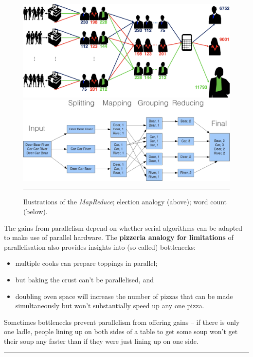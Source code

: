 \begin{figure}[!t]
\centering
\includegraphics[width=\textwidth]{images/DSML/MR1.png}\\ \includegraphics[width=\textwidth]{images/DSML/MR2.png}\caption[\small Illustrations of the \textit{MapReduce} paradigm]{\small Ilustrations of the \textit{MapReduce}; election analogy (above); word count (below).}\hrule\label{fig:MR2}
\end{figure}
\afterpage{\FloatBarrier}
The gains from parallelism depend on whether serial algorithms can be adapted to make use of parallel hardware. The \textbf{pizzeria analogy for limitations} of parallelisation also provides insights into (so-called) bottlenecks: 
\begin{itemize}[noitemsep]
\item multiple cooks can prepare toppings in parallel; 
\item but baking the crust can't be parallelised, and
\item doubling oven space will increase the number of pizzas that can be made simultaneously but won't substantially speed up any one pizza.
\end{itemize}
Sometimes bottlenecks prevent parallelism from offering gains -- if there is only one ladle, people lining up on both sides of a table to get some soup won't get their soup any faster than if they were just lining up on one side. 
\begin{center}
    \rule{0.5\textwidth}{.4pt}
\end{center}
